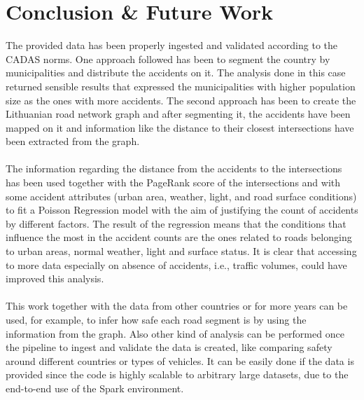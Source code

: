 \chapter{Conclusion \& Future Work} \label{ch:conclusion}

The provided data has been properly ingested and validated according to the \ac{CADAS} norms. One approach followed has been to segment the country by municipalities and distribute the accidents on it. The analysis done in this case returned sensible results that expressed the municipalities with higher population size as the ones with more accidents. The second approach has been to create the Lithuanian road network graph and after segmenting it, the accidents have been mapped on it and information like the distance to their closest intersections have been extracted from the graph. \\
\\
The information regarding the distance from the accidents to the intersections has been used together with the PageRank score of the intersections and with some accident attributes (urban area, weather, light, and road surface conditions) to fit a Poisson Regression model with the aim of justifying the count of accidents by different factors. The result of the regression means that the conditions that influence the most in the accident counts are the ones related to roads belonging to urban areas, normal weather, light and surface status. It is clear that accessing to more data especially on absence of accidents, i.e., traffic volumes, could have improved this analysis. 
\\
\\
This work together with the data from other countries or for more years can be used, for example, to infer how safe each road segment is by using the information from the graph. Also other kind of analysis can be performed once the pipeline to ingest and validate the data is created, like comparing safety around different countries or types of vehicles. It can be easily done if the data is provided since the code is highly scalable to arbitrary large datasets, due to the end-to-end use of the Spark environment. 
